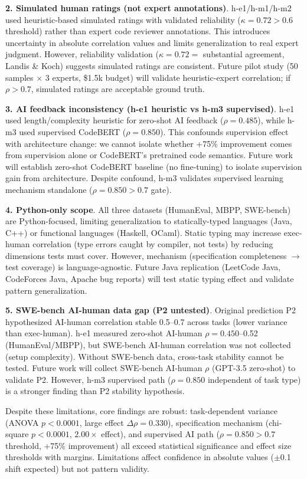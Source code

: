 \textbf{2. Simulated human ratings (not expert annotations)}. h-e1/h-m1/h-m2 used heuristic-based simulated ratings with validated reliability ($\kappa=0.72 > 0.6$ threshold) rather than expert code reviewer annotations. This introduces uncertainty in absolute correlation values and limits generalization to real expert judgment. However, reliability validation ($\kappa=0.72 =$ substantial agreement, Landis \& Koch) suggests simulated ratings are consistent. Future pilot study (50 samples $\times$ 3 experts, \$1.5k budget) will validate heuristic-expert correlation; if $\rho>0.7$, simulated ratings are acceptable ground truth.

\textbf{3. AI feedback inconsistency (h-e1 heuristic vs h-m3 supervised)}. h-e1 used length/complexity heuristic for zero-shot AI feedback ($\rho=0.485$), while h-m3 used supervised CodeBERT ($\rho=0.850$). This confounds supervision effect with architecture change: we cannot isolate whether +75\% improvement comes from supervision alone or CodeBERT's pretrained code semantics. Future work will establish zero-shot CodeBERT baseline (no fine-tuning) to isolate supervision gain from architecture. Despite confound, h-m3 validates supervised learning mechanism standalone ($\rho=0.850 > 0.7$ gate).

\textbf{4. Python-only scope}. All three datasets (HumanEval, MBPP, SWE-bench) are Python-focused, limiting generalization to statically-typed languages (Java, C++) or functional languages (Haskell, OCaml). Static typing may increase exec-human correlation (type errors caught by compiler, not tests) by reducing dimensions tests must cover. However, mechanism (specification completeness $\rightarrow$ test coverage) is language-agnostic. Future Java replication (LeetCode Java, CodeForces Java, Apache bug reports) will test static typing effect and validate pattern generalization.

\textbf{5. SWE-bench AI-human data gap (P2 untested)}. Original prediction P2 hypothesized AI-human correlation stable 0.5--0.7 across tasks (lower variance than exec-human). h-e1 measured zero-shot AI-human $\rho=0.450$--0.52 (HumanEval/MBPP), but SWE-bench AI-human correlation was not collected (setup complexity). Without SWE-bench data, cross-task stability cannot be tested. Future work will collect SWE-bench AI-human $\rho$ (GPT-3.5 zero-shot) to validate P2. However, h-m3 supervised path ($\rho=0.850$ independent of task type) is a stronger finding than P2 stability hypothesis.

Despite these limitations, core findings are robust: task-dependent variance (ANOVA $p<0.0001$, large effect $\Delta\rho=0.330$), specification mechanism (chi-square $p<0.0001$, $2.00\times$ effect), and supervised AI path ($\rho=0.850 > 0.7$ threshold, +75\% improvement) all exceed statistical significance and effect size thresholds with margins. Limitations affect confidence in absolute values ($\pm$0.1 shift expected) but not pattern validity.

